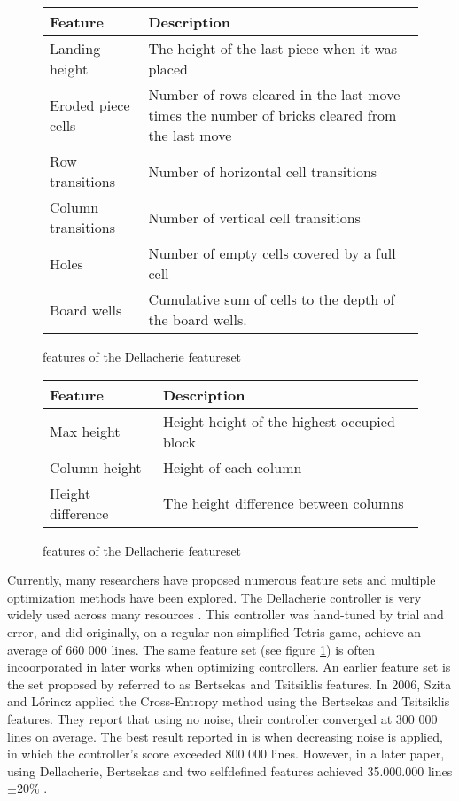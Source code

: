 \begin{figure}[h!]
\begin{center}
\begin{tabular}{| l | p{8cm} |}
\hline
\textbf{Feature} & \textbf{Description}\\
\hline
Landing height & The height of the last piece when it was placed\\
\hline
Eroded piece cells & Number of rows cleared in the last move
times the number of bricks cleared from the last move\\
\hline
Row transitions & Number of horizontal cell transitions\\
\hline
Column transitions & Number of vertical cell transitions \\
\hline
Holes & Number of empty cells covered by a full cell\\
\hline
Board wells & Cumulative sum of cells to the depth of
the board wells.\\
\hline
\end{tabular}
\end{center}
\caption{features of the Dellacherie featureset \label{table:dellfeat}}
\end{figure}

\begin{figure}[h!]
\begin{center}
\begin{tabular}{| l | p{8cm} |}
\hline
\textbf{Feature} & \textbf{Description}\\
\hline
Max height & Height height of the highest occupied block\\
\hline
Column height & Height of each column\\
\hline
Height difference & The height difference between columns\\
\hline
\end{tabular}
\end{center}
\caption{features of the Dellacherie featureset \label{table:bertfeat}}
\end{figure}


Currently, many researchers have proposed numerous 
feature sets and multiple 
optimization methods have been explored. 
The Dellacherie controller is very widely used across many resources
\citep{fahey}. This controller was hand-tuned by trial and error,
and did originally, on a regular non-simplified Tetris game, achieve an average of
660 000 lines. The same feature set (see figure \ref{table:dellfeat}) is 
often incoorporated in later works when optimizing controllers. An earlier
feature set is the set proposed by \citep{Bertsekas} referred to as Bertsekas and
Tsitsiklis features. In 2006, Szita and L\H{o}rincz \citep{szita:06} applied the Cross-Entropy
method using the Bertsekas and Tsitsiklis features. They report that using no noise,
their controller converged at 300 000 lines on average. 
The best result reported in \citep{szita:06}
is when decreasing noise is applied, 
in which the controller's score exceeded 800 000 lines. 
However, in a later paper, using Dellacherie, 
Bertsekas and two selfdefined features achieved 
35.000.000 lines $\pm 20\%$  \citep{scherrer2009}.\\


